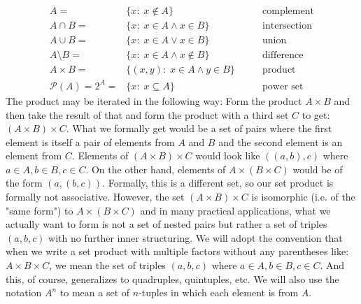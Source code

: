 \begin{eqnarray}
 \overline{A}  =& \{x: \; x \notin A \}                    \qquad &\text{complement} \\	
 A \cap B      =& \{x: \; x \in A \wedge x \in    B \}     \qquad &\text{intersection} \\
 A \cup B      =& \{x: \; x \in A \vee   x \in    B \}     \qquad &\text{union} \\
 A \setminus B =& \{x: \; x \in A \wedge x \notin B \}     \qquad &\text{difference} \\
 A \times B    =& \{(x,y): \; x \in A \wedge y \in    B \} \qquad &\text{product} \\
 \mathcal{P}(A) 
        = 2^A = &  \{x : \; x \subseteq A \}               \qquad &\text{power set}
\end{eqnarray}
The product may be iterated in the following way: Form the product $A \times B$ and then take the result of that and form the product with a third set $C$ to get: $(A \times B) \times C$. What we formally get would be a set of pairs where the first element is itself a pair of elements from $A$ and $B$ and the second element is an element from $C$. Elements of $(A \times B) \times C$ would look like $((a,b),c)$ where $a \in A, b \in B, c \in C$. On the other hand, elements of $A \times (B \times C)$ would be of the form $(a, (b,c))$. Formally, this is a different set, so our set product is formally not associative. However, the set $(A \times B) \times C$ is isomorphic (i.e. of the "same form") to $A \times (B \times C)$ and in many practical applications, what we actually want to form is not a set of nested pairs but rather a set of triples $(a,b,c)$ with no further inner structuring. We will adopt the convention that when we write a set product with multiple factors without any parentheses like: $A \times B \times C$, we mean the set of triples $(a,b,c)$ where $a \in A, b \in B, c \in C$. And this, of course, generalizes to quadruples, quintuples, etc. We will also use the notation $A^n$ to mean a set of $n$-tuples in which each element is from $A$.

